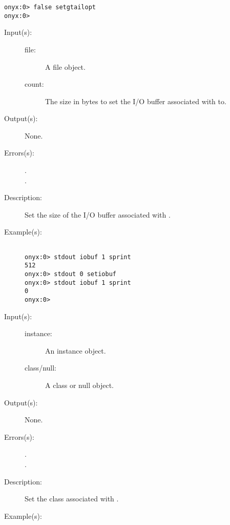 \begin{description}
\begin{description}
\begin{verbatim}
onyx:0> false setgtailopt
onyx:0>
		\end{verbatim}
	\end{description}
\label{systemdict:setiobuf}
\item[{\onyxop{file count}{setiobuf}{--}}: ]
	\begin{description}\item[]
	\item[Input(s): ]
		\begin{description}\item[]
		\item[file: ]
			A file object.
		\item[count: ]
			The size in bytes to set the I/O buffer associated with
			 to.
		\end{description}
	\item[Output(s): ] None.
	\item[Errors(s): ]
		\begin{description}\item[]
		\item[.]
		\item[.]
		\end{description}
	\item[Description: ]
		Set the size of the I/O buffer associated with .
	\item[Example(s): ]\begin{verbatim}

onyx:0> stdout iobuf 1 sprint
512
onyx:0> stdout 0 setiobuf
onyx:0> stdout iobuf 1 sprint
0
onyx:0>
		\end{verbatim}
	\end{description}
\label{systemdict:setisa}
\item[{\onyxop{instance class/null}{setisa}{--}}: ]
	\begin{description}\item[]
	\item[Input(s): ]
		\begin{description}\item[]
		\item[instance: ]
			An instance object.
		\item[class/null: ]
			A class or null object.
		\end{description}
	\item[Output(s): ] None.
	\item[Errors(s): ]
		\begin{description}\item[]
		\item[.]
		\item[.]
		\end{description}
	\item[Description: ]
		Set the class associated with .
	\item[Example(s): ]\begin{verbatim}


\end{verbatim}
\end{description}
\end{description}
